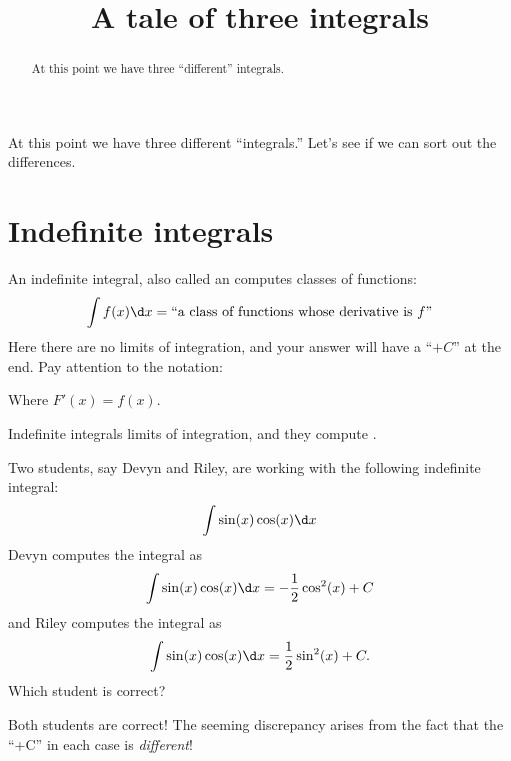 \documentclass{ximera}
\title[Dig-In:]{A tale of three integrals}
\begin{document}
\begin{abstract}
  At this point we have three ``different'' integrals. 
\end{abstract}
\maketitle

At this point we have three different ``integrals.'' Let's see if we
can sort out the differences.

\section{Indefinite integrals}

An indefinite integral, also called an  computes
classes of functions:
\[
\int f(x) \d x = ``\text{a class of functions whose derivative is $f$''}
\]
Here there are no limits of integration, and your answer will have a
``$+C$'' at the end. Pay attention to the notation:
\begin{image}
\end{image}
Where $F'(x) = f(x)$.
\begin{explanation}%
  Indefinite integrals
   limits of
  integration, and they compute .
\end{explanation}

\begin{question}
  Two students, say Devyn and Riley, are working with the following
  indefinite integral:
  \[
  \int \sin(x)\cos(x)\d x
  \]
  Devyn computes the integral as
  \[
  \int \sin(x)\cos(x)\d x = -\frac{1}{2}\cos^2(x) + C
  \]
  and Riley computes the integral as
  \[
  \int \sin(x)\cos(x)\d x = \frac{1}{2}\sin^2(x) + C.
  \]
  Which student is correct?
  \begin{multipleChoice}
  \end{multipleChoice}
  \begin{feedback}
    Both students are correct! The seeming discrepancy arises from the
    fact that the ``+C'' in each case is \textit{different}!
  \end{feedback}
\end{question}
\end{document}
